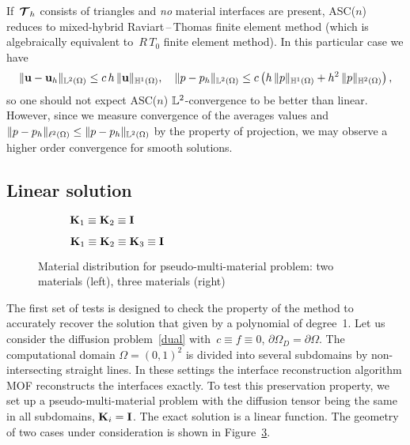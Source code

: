 If~${\boldsymbol{\mathbf{\mathcal T}}}_h$ consists of triangles and \emph{no} material interfaces are present, ASC($n$) reduces to mixed-hybrid Raviart\,--\,Thomas finite element method (which is algebraically equivalent to~$R\,T_0$ finite element method). In this particular case we have~\cite{M2AN_1980__14_3_249_0}
$$
	\|\boldsymbol{\mathbf{u}} - \boldsymbol{\mathbf{u}}_h\|_{{\mathbb L^2\left({\Omega}\right)}} \le c\,h\,\|\boldsymbol{\mathbf{u}}\|_{{\mathbb H^{1}\left(\Omega\right)}},\quad\|p - p_h\|_{{\mathbb L^2\left({\Omega}\right)}} \le c \left( h\,\|p\|_{{\mathbb H^{1}\left(\Omega\right)}} + h^2\,\|p\|_{{\mathbb H^{2}\left(\Omega\right)}} \right),
$$
so one should not expect ASC($n$) ${\mathbb L^2}$-convergence to be better than linear. 
However, since we measure convergence of the averages values and
$	\| p - p_h \|_{{\ell^2\left({\Omega}\right)}} \le \| p - p_h \|_{{\mathbb L^2\left({\Omega}\right)}} $
by the property of projection, we may observe a higher order convergence for smooth solutions.

\subsection{Linear solution}

\begin{figure}[h]
	\centering
	\begin{subfigure}{.41\linewidth}
		\centering
		\caption{$\boldsymbol{\mathbf{K}}_1 \equiv \boldsymbol{\mathbf{K}}_2 \equiv \boldsymbol{\mathbf{I}}$}
		\label{fig:fake:2}
	\end{subfigure}%
	\hfill
	\begin{subfigure}{.41\linewidth}
		\centering
		\caption{$\boldsymbol{\mathbf{K}}_1 \equiv \boldsymbol{\mathbf{K}}_2 \equiv \boldsymbol{\mathbf{K}}_3 \equiv \boldsymbol{\mathbf{I}}$}
		\label{fig:fake:3}
	\end{subfigure}
	\caption{Material distribution for pseudo-multi-material problem: two materials (left), three materials (right)
	\label{fig:fake}}		
\end{figure}

The first set of tests is designed to check the property of the method to accurately recover the solution that given by a  polynomial of degree~1. Let us consider the diffusion problem~\eqref{dual} with~$c \equiv f \equiv 0$, $\partial\Omega_D = \partial\Omega$. The computational domain $\Omega=(0,1)^2$ is divided into several subdomains by non-intersecting straight lines. In these settings the interface reconstruction algorithm MOF reconstructs the interfaces exactly. To test this preservation property, we set up a pseudo-multi-material problem with the diffusion tensor being the same in all subdomains, $\boldsymbol{\mathbf{K}}_i = \boldsymbol{\mathbf{I}}$. The exact solution is a linear function. The geometry of two cases under consideration is shown in Figure~\ref{fig:fake}.
	
